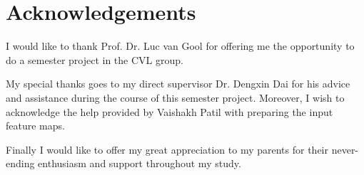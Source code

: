 %


\newpage

\chapter*{Acknowledgements}
I would like to thank Prof. Dr. Luc van Gool for offering me the opportunity to do a semester project in the CVL group. 

My special thanks goes to my direct supervisor Dr. Dengxin Dai for his advice and assistance during the course of this semester project. Moreover, I wish to acknowledge the help provided by Vaishakh Patil with preparing the input feature maps.

Finally I would like to offer my great appreciation to my parents for their never-ending enthusiasm and support throughout my study. 


